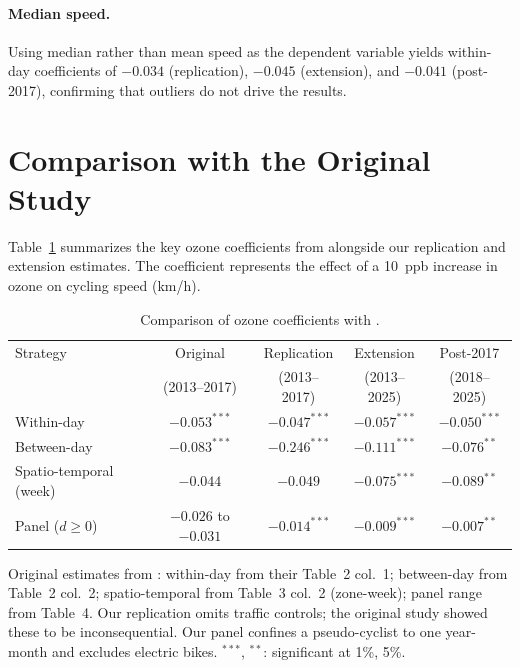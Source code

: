 \documentclass[12pt]{article}
\begin{document}
\paragraph{Median speed.} Using median rather than mean speed as the dependent variable yields within-day coefficients of $-0.034$ (replication), $-0.045$ (extension), and $-0.041$ (post-2017), confirming that outliers do not drive the results.


\section{Comparison with the Original Study} \label{sec:comparison}

Table~\ref{tab:comparison} summarizes the key ozone coefficients from \citet{klingen2020urban} alongside our replication and extension estimates. The coefficient represents the effect of a 10~ppb increase in ozone on cycling speed (km/h).

\begin{table}[H]
\centering
\caption{Comparison of ozone coefficients with \citet{klingen2020urban}.}
\label{tab:comparison}
\begin{tabular}{lcccc}
\toprule
Strategy & Original & Replication & Extension & Post-2017 \\
         & (2013--2017) & (2013--2017) & (2013--2025) & (2018--2025) \\
\midrule
Within-day        & $-0.053^{***}$ & $-0.047^{***}$ & $-0.057^{***}$ & $-0.050^{***}$ \\
Between-day       & $-0.083^{***}$ & $-0.246^{***}$ & $-0.111^{***}$ & $-0.076^{**}$ \\
Spatio-temporal (week) & $-0.044$  & $-0.049$       & $-0.075^{***}$ & $-0.089^{**}$  \\
Panel ($d \geq 0$) & $-0.026$ to $-0.031$ & $-0.014^{***}$ & $-0.009^{***}$ & $-0.007^{**}$ \\
\bottomrule
\end{tabular}

\medskip
\footnotesize Original estimates from \citet{klingen2020urban}: within-day from their Table~2 col.~1; between-day from Table~2 col.~2; spatio-temporal from Table~3 col.~2 (zone-week); panel range from Table~4. Our replication omits traffic controls; the original study showed these to be inconsequential. Our panel confines a pseudo-cyclist to one year-month and excludes electric bikes. $^{***}$, $^{**}$: significant at 1\%, 5\%.
\end{table}
\end{document}
